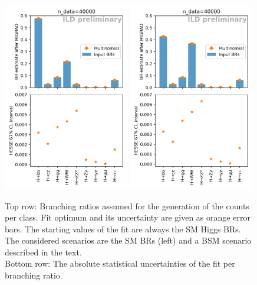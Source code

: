 \documentclass[11pt, hidelinks, a4paper]{scrartcl}
\begin{document}
\begin{figure}[ht]
    \centering
    \includegraphics[width=0.49\textwidth, keepaspectratio]{br_estimates}
    \includegraphics[width=0.49\textwidth, keepaspectratio]{changed_br_estimates}
    \caption{
        Top row: Branching ratios assumed for the generation of the counts per class.
        Fit optimum and its uncertainty are given as orange error bars.
        The starting values of the fit are always the SM Higgs BRs.
        The considered scenarios are the SM BRs (left)
        and a BSM scenario described in the text.
        \\
        Bottom row: The absolute statistical uncertainties
        of the fit per branching ratio.
    }\label{fig:brs}
\end{figure}
\end{document}
